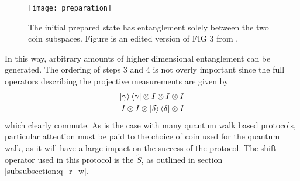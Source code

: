 \begin{figure}
    \centering
    \texttt{[image: preparation]}
    \caption{The initial prepared state has entanglement solely between the two coin subspaces. Figure is an edited version of FIG 3 from \cite{giordani2020}.}
    \label{fig:preparation}
\end{figure}
In this way, arbitrary amounts of higher dimensional entanglement can be generated.\newline
The ordering of steps 3 and 4 is not overly important since the full operators describing the projective measurements are given by
\begin{align}
    \ket{\gamma}\bra{\gamma} \otimes I \otimes I \otimes I\\
    I \otimes I \otimes \ket{\delta}\bra{\delta} \otimes I
\end{align}
which clearly commute.
As is the case with many quantum walk based protocols, particular attention must be paid to the choice of coin used for the quantum walk, as it will have a large impact on the success of the protocol.
The shift operator used in this protocol is the $\tilde{S}$, as outlined in section \ref{subsubsection:q_r_w}.

